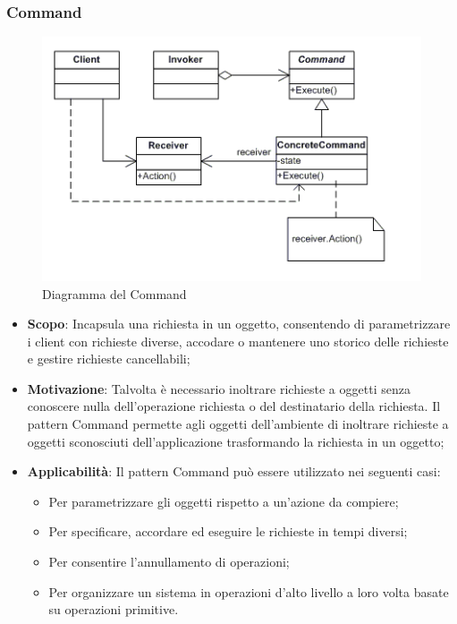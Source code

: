		\subsubsection{Command}	
		\begin{figure}[H]
		\centering
		\includegraphics[width=0.6\linewidth]{GraficiAppendici/command.png}
		\caption{Diagramma del  Command}
	\end{figure}
		\begin{itemize}
		\item \textbf{Scopo}: Incapsula una richiesta in un oggetto, consentendo di parametrizzare i
client con richieste diverse, accodare o mantenere uno storico delle richieste e gestire richieste cancellabili;
		\item \textbf{Motivazione}: Talvolta è necessario inoltrare richieste a oggetti senza conoscere
nulla dell’operazione richiesta o del destinatario della richiesta. Il pattern Command permette agli oggetti dell’ambiente di inoltrare richieste a oggetti sconosciuti dell’applicazione trasformando la richiesta in un oggetto;
		\item \textbf{Applicabilità}: Il pattern Command può essere utilizzato nei seguenti casi:
		\begin{itemize}
		\item Per parametrizzare gli oggetti rispetto a un’azione da compiere;
		\item Per specificare, accordare ed eseguire le richieste in tempi diversi;
		\item Per consentire l’annullamento di operazioni;
		\item Per organizzare un sistema in operazioni d’alto livello a loro volta basate su operazioni primitive.
		\end{itemize}

		\end{itemize}
		
	